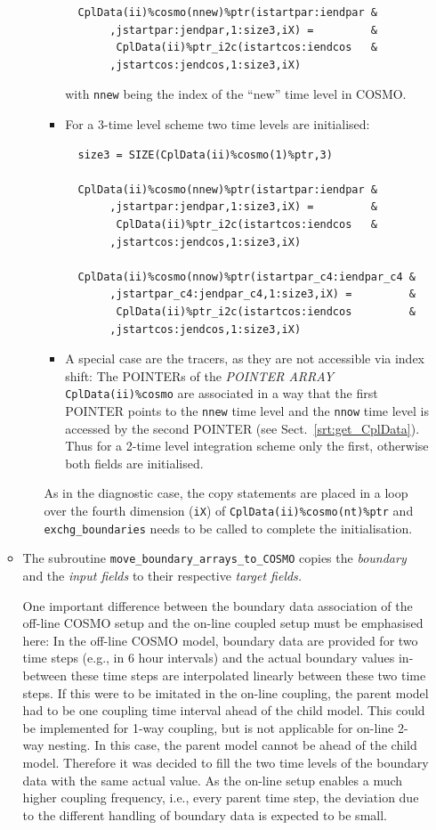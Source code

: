 \documentclass[11pt,twoside]{article}
\begin{document}
\begin{enumerate}
\begin{itemize}
\begin{itemize}
\begin{itemize}
\begin{verbatim}
  CplData(ii)%cosmo(nnew)%ptr(istartpar:iendpar &
       ,jstartpar:jendpar,1:size3,iX) =         &
        CplData(ii)%ptr_i2c(istartcos:iendcos   &
       ,jstartcos:jendcos,1:size3,iX)
\end{verbatim} 
with \verb|nnew| being the index of the ``new'' time level in COSMO. 
\item For a 3-time level scheme two time levels are initialised:
\begin{verbatim}
  size3 = SIZE(CplData(ii)%cosmo(1)%ptr,3)

  CplData(ii)%cosmo(nnew)%ptr(istartpar:iendpar &
       ,jstartpar:jendpar,1:size3,iX) =         &
        CplData(ii)%ptr_i2c(istartcos:iendcos   &
       ,jstartcos:jendcos,1:size3,iX)

  CplData(ii)%cosmo(nnow)%ptr(istartpar_c4:iendpar_c4 &
       ,jstartpar_c4:jendpar_c4,1:size3,iX) =         &
        CplData(ii)%ptr_i2c(istartcos:iendcos         &
       ,jstartcos:jendcos,1:size3,iX)
\end{verbatim} 
\item A special case are the tracers, as they are not accessible via index shift:
      The { \footnotesize POINTERs } of the {\footnotesize \it POINTER ARRAY} 
      \verb|CplData(ii)%cosmo| are associated in a way that the first 
      { \footnotesize POINTER} points to the \verb|nnew| time level
         and the \verb|nnow| time level is accessed by the second 
         { \footnotesize POINTER} (see Sect.\ \ref{srt:get_CplData}).
       Thus for a 2-time level integration scheme only the first, otherwise
       both fields are initialised.  
\end{itemize}%
 As in the diagnostic case, the copy statements are placed in a loop over the 
 fourth dimension (\verb|iX|) of \verb|CplData(ii)%cosmo(nt)%ptr| and \verb|exchg_boundaries|
 needs to be called to complete the initialisation.
\end{itemize}

\item The subroutine \verb|move_boundary_arrays_to_COSMO| copies the 
{\it boundary} and the {\it input fields} to their respective {\it target 
fields.}

One important difference  between the boundary data association of the off-line 
COSMO setup and the on-line coupled setup must be emphasised here:
In the off-line COSMO model, boundary data are provided for two time steps
(e.g., in 6 hour intervals) and the actual boundary values in-between these time
steps are interpolated linearly between these two time steps. If this 
were to be imitated in the on-line coupling, the parent model had to be 
 one coupling time interval ahead of the child model. This could be
 implemented for 1-way coupling, but is not applicable for 
on-line 2-way nesting. In this case, the parent model
cannot be ahead of the child model. Therefore it was decided to fill the two
time levels of the boundary data with the same actual value. As the on-line
setup enables a much higher coupling frequency, i.e., every parent
time step, the deviation due to the
different handling of boundary data is expected to be small. 


\end{itemize}
\end{enumerate}
\end{document}
